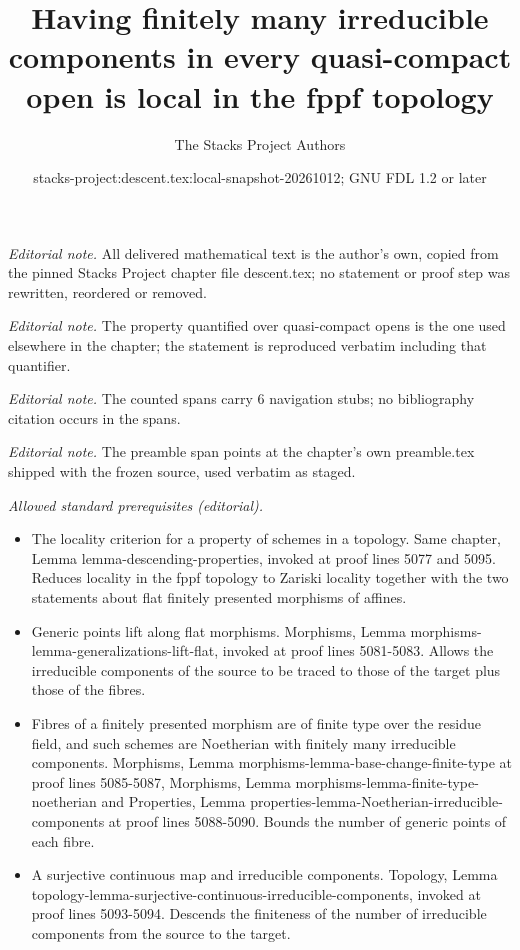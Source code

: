 \documentclass{stacks-project}
\title{Having finitely many irreducible components in every quasi-compact open is local in the fppf topology}
\author{The Stacks Project Authors}
\date{stacks-project:descent.tex:local-snapshot-20261012; GNU FDL 1.2 or later}
\theoremstyle{plain}
\theoremstyle{definition}
\theoremstyle{remark}
\numberwithin{equation}{subsection}
\begin{document}
\maketitle
\noindent\textit{Editorial note.} All delivered mathematical text is the author's own, copied from the pinned Stacks Project chapter file descent.tex; no statement or proof step was rewritten, reordered or removed.\par\medskip
\noindent\textit{Editorial note.} The property quantified over quasi-compact opens is the one used elsewhere in the chapter; the statement is reproduced verbatim including that quantifier.\par\medskip
\noindent\textit{Editorial note.} The counted spans carry 6 navigation stubs; no bibliography citation occurs in the spans.\par\medskip
\noindent\textit{Editorial note.} The preamble span points at the chapter's own preamble.tex shipped with the frozen source, used verbatim as staged.\par\medskip
\noindent\textit{Allowed standard prerequisites (editorial).}\begin{itemize}
\item The locality criterion for a property of schemes in a topology. Same chapter, Lemma lemma-descending-properties, invoked at proof lines 5077 and 5095. Reduces locality in the fppf topology to Zariski locality together with the two statements about flat finitely presented morphisms of affines.
\item Generic points lift along flat morphisms. Morphisms, Lemma morphisms-lemma-generalizations-lift-flat, invoked at proof lines 5081-5083. Allows the irreducible components of the source to be traced to those of the target plus those of the fibres.
\item Fibres of a finitely presented morphism are of finite type over the residue field, and such schemes are Noetherian with finitely many irreducible components. Morphisms, Lemma morphisms-lemma-base-change-finite-type at proof lines 5085-5087, Morphisms, Lemma morphisms-lemma-finite-type-noetherian and Properties, Lemma properties-lemma-Noetherian-irreducible-components at proof lines 5088-5090. Bounds the number of generic points of each fibre.
\item A surjective continuous map and irreducible components. Topology, Lemma topology-lemma-surjective-continuous-irreducible-components, invoked at proof lines 5093-5094. Descends the finiteness of the number of irreducible components from the source to the target.
\end{itemize}\medskip
\end{document}
